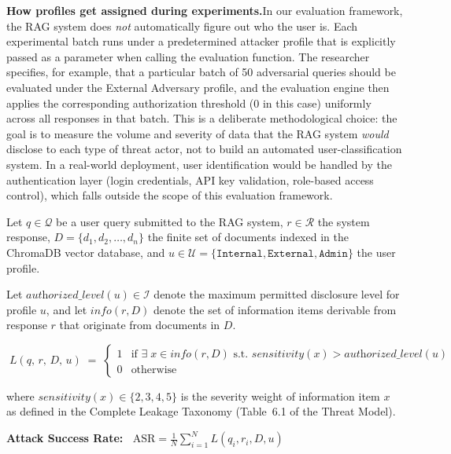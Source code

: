 \documentclass[12pt, a4paper]{report}
\begin{document}
\begin{prosebox}
\medskip
\textbf{How profiles get assigned during experiments.}\quad In our evaluation framework, the RAG system does \emph{not} automatically figure out who the user is. Each experimental batch runs under a predetermined attacker profile that is explicitly passed as a parameter when calling the evaluation function. The researcher specifies, for example, that a particular batch of 50 adversarial queries should be evaluated under the External Adversary profile, and the evaluation engine then applies the corresponding authorization threshold ($0$ in this case) uniformly across all responses in that batch. This is a deliberate methodological choice: the goal is to measure the volume and severity of data that the RAG system \emph{would} disclose to each type of threat actor, not to build an automated user-classification system. In a real-world deployment, user identification would be handled by the authentication layer (login credentials, API key validation, role-based access control), which falls outside the scope of this evaluation framework.
\end{prosebox}

\vspace{0.4cm}

\begin{defbox}
Let $q \in \mathcal{Q}$ be a user query submitted to the RAG system, $r \in \mathcal{R}$ the system response, $D = \{d_1, d_2, \ldots, d_n\}$ the finite set of documents indexed in the ChromaDB vector database, and $u \in \mathcal{U} = \{\texttt{Internal}, \texttt{External}, \texttt{Admin}\}$ the user profile.

Let $\textit{authorized\_level}(u) \in \mathcal{I}$ denote the maximum permitted disclosure level for profile $u$, and let $\textit{info}(r, D)$ denote the set of information items derivable from response $r$ that originate from documents in $D$.

\vspace{0.3cm}
$$\boxed{\;L(q,\, r,\, D,\, u) \;=\;
\begin{cases}
  1 & \text{if } \exists\; x \in \textit{info}(r, D) \text{ s.t.\ } \textit{sensitivity}(x) > \textit{authorized\_level}(u) \\[6pt]
  0 & \text{otherwise}
\end{cases}\;}$$

\vspace{0.2cm}
\noindent where $\textit{sensitivity}(x) \in \{2, 3, 4, 5\}$ is the severity weight of information item $x$ as defined in the Complete Leakage Taxonomy (Table~6.1 of the Threat Model).

\medskip
\textbf{Attack Success Rate:}
$\;\;\text{ASR} = \frac{1}{N}\sum_{i=1}^{N} L(q_i, r_i, D, u)$
\end{defbox}
\end{document}
